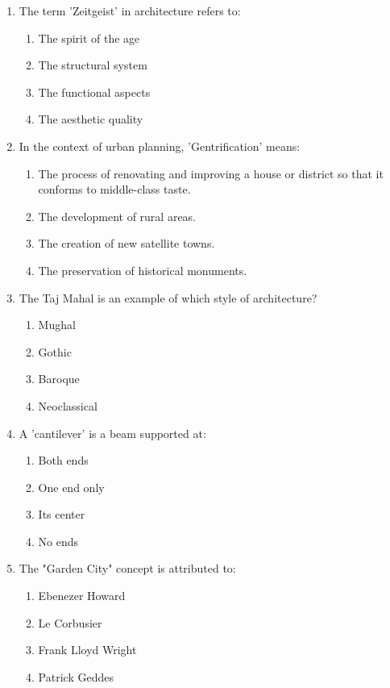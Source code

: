 \documentclass[a4paper,10pt]{article}
\begin{document}
\begin{enumerate}
    \item The term 'Zeitgeist' in architecture refers to:
    \begin{enumerate}
        \item The spirit of the age
        \item The structural system
        \item The functional aspects
        \item The aesthetic quality
    \end{enumerate}

    \item In the context of urban planning, 'Gentrification' means:
    \begin{enumerate}
        \item The process of renovating and improving a house or district so that it conforms to middle-class taste.
        \item The development of rural areas.
        \item The creation of new satellite towns.
        \item The preservation of historical monuments.
    \end{enumerate}
    
    \item The Taj Mahal is an example of which style of architecture?
    \begin{enumerate}
        \item Mughal
        \item Gothic
        \item Baroque
        \item Neoclassical
    \end{enumerate}
    
    \item A 'cantilever' is a beam supported at:
    \begin{enumerate}
        \item Both ends
        \item One end only
        \item Its center
        \item No ends
    \end{enumerate}
    
    \item The "Garden City" concept is attributed to:
    \begin{enumerate}
        \item Ebenezer Howard
        \item Le Corbusier
        \item Frank Lloyd Wright
        \item Patrick Geddes
    \end{enumerate}
    

\end{enumerate}
\end{document}
